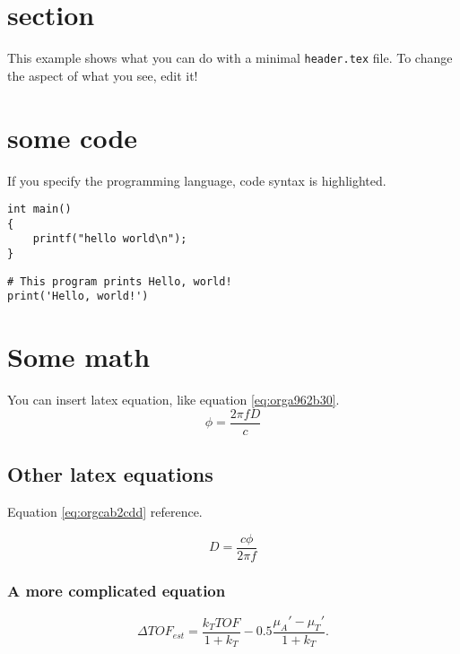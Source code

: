 


\maketitle

\newpage

\section{section}
\label{sec:orgdedcd3b}
This example shows what you can do with a minimal \texttt{header.tex} file.
To change the aspect of what you see, edit it!

\section{some code}
\label{sec:org7075bdd}
If you specify the programming language, code syntax is highlighted.
\begin{verbatim}
int main()
{
    printf("hello world\n");
}
\end{verbatim}

\begin{verbatim}
# This program prints Hello, world!
print('Hello, world!')
\end{verbatim}

\section{Some math}
\label{sec:org6abe8fe}
You can insert latex equation, like equation \ref{eq:orga962b30}.
\begin{equation}
\label{eq:orga962b30}
\phi = \frac{2\pi fD}{c}
\end{equation}
\subsection{Other latex equations}
\label{sec:orgdbaeed6}
Equation \ref{eq:orgcab2cdd} reference.

\begin{equation}
\label{eq:orgcab2cdd}
D = \frac{c\phi}{2\pi f}
\end{equation}

\subsubsection{A more complicated equation}
\label{sec:orgab37597}

\begin{equation}
\Delta TOF_{est} = \frac{k_T TOF}{1+k_T } - 0.5 \frac{\mu_A' - \mu_T'}{1+k_T}.
\end{equation}

